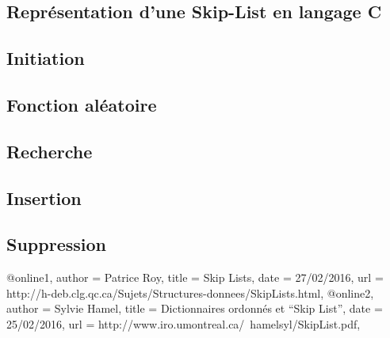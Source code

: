 \documentclass[hidelinks,a4paper, 12pt]{article}
\begin{document}
	\begin{appendices}
	\newpage
	\section{Représentation d'une Skip-List en langage C}
	\subsection{Initiation}\label{SKInit}
	
	\subsection{Fonction aléatoire}\label{SKRandom}
	

	\subsection{Recherche}\label{SKSearch}
	

	\subsection{Insertion}\label{SKInsert}
	
	
	\subsection{Suppression}\label{SKDelete}
	
	\newpage
	\end{appendices}
	
	
	@online{1,
		author = {Patrice Roy},
		title = {Skip Lists},
		date = {27/02/2016},
		url = {http://h-deb.clg.qc.ca/Sujets/Structures-donnees/SkipLists.html},
	}
	@online{2,
		author = {Sylvie Hamel},
		title = {Dictionnaires ordonnés et “Skip List”},
		date = {25/02/2016},
		url = {http://www.iro.umontreal.ca/~hamelsyl/SkipList.pdf},
	}
	
\end{document}
